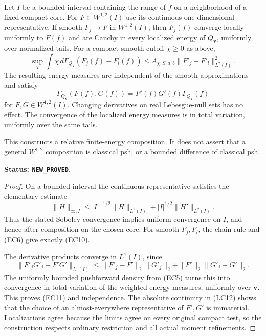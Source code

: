 \begin{theorem}
\label{thm:r11-sobolev-scalar-calculus}
Let $I$ be a bounded interval containing the range of $f$ on
a neighborhood of a fixed compact core.  For
$F\in W^{1,2}(I)$ use its continuous one-dimensional
representative.  If smooth $F_j\to F$ in $W^{1,2}(I)$,
then $F_j(f)$ converge locally uniformly to $F(f)$ and are
Cauchy in every localized energy of $Q_{\mathbf v}$,
uniformly over normalized tails.  For a compact smooth cutoff
$\chi\ge0$ as above,
\[
 \sup_{\mathbf v}
 \int\chi\,d\Gamma_{Q_{\mathbf v}}
                       (F_j(f)-F_l(f))
       \le A_{\chi,S,a,b}\|F'_j-F'_l\|_{L^2(I)}^2.
 \tag{EC10}
\]
The resulting energy measures are independent of the smooth
approximations and satisfy
\[
 \Gamma_{Q_{\mathbf v}}(F(f),G(f))
           =F'(f)G'(f)\Gamma_{Q_{\mathbf v}}(f)
 \tag{EC11}
\]
for $F,G\in W^{1,2}(I)$.  Changing derivatives on real
Lebesgue-null sets has no effect.  The convergence of the
localized energy measures is in total variation, uniformly
over the same tails.

This constructs a relative finite-energy composition.  It
does not assert that a general $W^{1,2}$ composition is
classical psh, or a bounded difference of classical psh.
\end{theorem}

\noindent\textbf{Status: \texttt{NEW\_PROVED}}.

\begin{proof}
On a bounded interval the continuous representative satisfies
the elementary estimate
\[
 \|H\|_{\infty,I}
 \le |I|^{-1/2}\|H\|_{L^2(I)}
                         +|I|^{1/2}\|H'\|_{L^2(I)}.
\]
Thus the stated Sobolev convergence implies uniform
convergence on $I$, and hence after composition on the
chosen core.  For smooth $F_j,F_l$, the chain rule and
(EC6) give exactly (EC10).

The derivative products converge in $L^1(I)$, since
\[
 \|F'_jG'_j-F'G'\|_{L^1(I)}
 \le\|F'_j-F'\|_2\|G'_j\|_2
                       +\|F'\|_2\|G'_j-G'\|_2.
\]
The uniformly bounded pushforward density from (EC5) turns
this into convergence in total variation of the weighted
energy measures, uniformly over $\mathbf v$.  This proves
(EC11) and independence.  The absolute continuity in (LC12)
shows that the choice of an almost-everywhere representative
of $F',G'$ is immaterial.  Localizations agree because the
limits agree on every original compact test, so the
construction respects ordinary restriction and all actual
moment refinements.
\end{proof}

